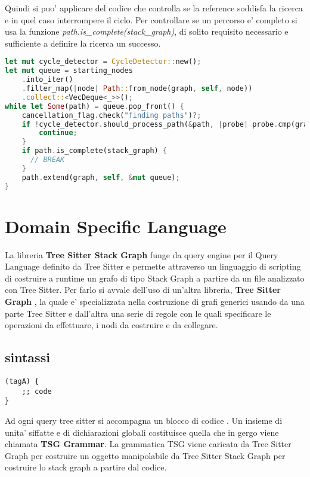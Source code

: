Quindi si puo' applicare del codice che controlla se la reference soddisfa la ricerca e in quel caso interrompere il ciclo. Per controllare se un percorso e' completo si usa la funzione \emph{path.is\_complete(stack\_graph)}, di solito requisito necessario e sufficiente a definire la ricerca un successo.

\begin{lstlisting}[language=Rust]
let mut cycle_detector = CycleDetector::new();
let mut queue = starting_nodes
    .into_iter()
    .filter_map(|node| Path::from_node(graph, self, node))
    .collect::<VecDeque<_>>();
while let Some(path) = queue.pop_front() {
    cancellation_flag.check("finding paths")?;
    if !cycle_detector.should_process_path(&path, |probe| probe.cmp(graph, self, &path)) {
        continue;
    }
    if path.is_complete(stack_graph) {
      // BREAK
    }
    path.extend(graph, self, &mut queue);
}
\end{lstlisting}

\section{Domain Specific Language}

La libreria \textbf{Tree Sitter Stack Graph} \cite{TreeSitterStackGraph} funge da query engine per il Query Language definito da Tree Sitter e permette attraverso un linguaggio di scripting di costruire a runtime un grafo di tipo Stack Graph a partire da un file analizzato con Tree Sitter.
Per farlo si avvale dell'uso di un'altra libreria, \textbf{Tree Sitter Graph} \cite{TreeSitterGraph}, la quale e' specializzata nella costruzione di grafi generici usando da una parte Tree Sitter e dall'altra una serie di regole con le quali specificare le operazioni da effettuare, i nodi da costruire e da collegare.

\subsection{sintassi}

\begin{lstlisting}
(tagA) {
    ;; code
}
\end{lstlisting}

Ad ogni query tree sitter si accompagna un blocco di codice \cite{TreeSitterGraphReferenceHighLevelStructure}.
Un insieme di unita' siffatte e di dichiarazioni globali costituisce quella che in gergo viene chiamata \textbf{TSG Grammar}.
La grammatica TSG viene caricata da Tree Sitter Graph per costruire un oggetto manipolabile da Tree Sitter Stack Graph per costruire lo stack graph a partire dal codice.

